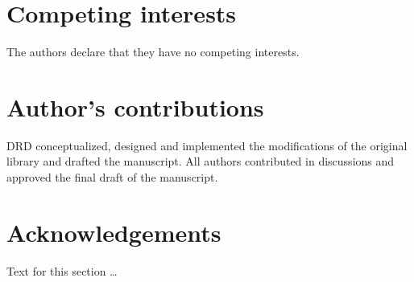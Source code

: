 \documentclass[twocolumn]{bmcart}
\begin{document}

\begin{backmatter}

\section*{Competing interests}

The authors declare that they have no competing interests.



\section*{Author's contributions}

DRD conceptualized, designed and implemented the modifications of the original
library and drafted the manuscript.  All authors contributed in discussions and
approved the final draft of the manuscript.



\section*{Acknowledgements}
  Text for this section \ldots




\end{backmatter}
\end{document}
